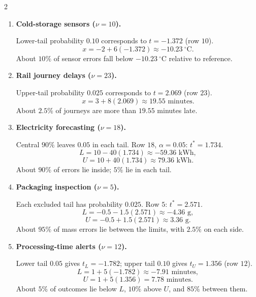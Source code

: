 \begin{multicols}{2}
\begin{enumerate}[leftmargin=*,itemsep=5pt,parsep=1pt,topsep=2pt]
			\columnbreak
			\item \textbf{Cold-storage sensors ($\nu=10$).}
			\par Lower-tail probability $0.10$ corresponds to $t=-1.372$ (row $10$).
			\[x=-2+6(-1.372)\approx\boxed{-10.23\ ^\circ\mathrm{C}}.\]
			About $10\%$ of sensor errors fall below $-10.23\ ^\circ\mathrm{C}$ relative to reference.
			
			\item \textbf{Rail journey delays ($\nu=23$).}
			\par Upper-tail probability $0.025$ corresponds to $t=2.069$ (row $23$).
			\[x=3+8(2.069)\approx\boxed{19.55\text{ minutes}}.\]
			About $2.5\%$ of journeys are more than $19.55$ minutes late.
			
			\item \textbf{Electricity forecasting ($\nu=18$).}
			\par Central $90\%$ leaves $0.05$ in each tail. Row $18$, $\alpha=0.05$: $t^*=1.734$.
			\[L=10-40(1.734)\approx\boxed{-59.36\text{ kWh}},\]
			\[U=10+40(1.734)\approx\boxed{79.36\text{ kWh}}.\]
			About $90\%$ of errors lie inside; $5\%$ lie in each tail.
			
			\item \textbf{Packaging inspection ($\nu=5$).}
			\par Each excluded tail has probability $0.025$. Row $5$: $t^*=2.571$.
			\[L=-0.5-1.5(2.571)\approx\boxed{-4.36\text{ g}},\]
			\[U=-0.5+1.5(2.571)\approx\boxed{3.36\text{ g}}.\]
			About $95\%$ of mass errors lie between the limits, with $2.5\%$ on each side.
			
			\item \textbf{Processing-time alerts ($\nu=12$).}
			\par Lower tail $0.05$ gives $t_L=-1.782$; upper tail $0.10$ gives $t_U=1.356$ (row $12$).
			\[L=1+5(-1.782)\approx\boxed{-7.91\text{ minutes}},\]
			\[U=1+5(1.356)=\boxed{7.78\text{ minutes}}.\]
			About $5\%$ of outcomes lie below $L$, $10\%$ above $U$, and $85\%$ between them.
		\end{enumerate}
	\end{multicols}

